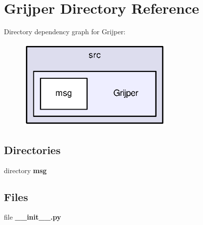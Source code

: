 \section{Grijper Directory Reference}
\label{dir_6ece005d40bc20ec437195d9bab1d725}
Directory dependency graph for Grijper\-:\nopagebreak
\begin{figure}[H]
\begin{center}
\leavevmode
\includegraphics[width=218pt]{dir_6ece005d40bc20ec437195d9bab1d725_dep}
\end{center}
\end{figure}
\subsection*{Directories}
\begin{DoxyCompactItemize}
\item 
directory {\bf msg}
\end{DoxyCompactItemize}
\subsection*{Files}
\begin{DoxyCompactItemize}
\item 
file {\bf \-\_\-\-\_\-init\-\_\-\-\_\-.\-py}
\end{DoxyCompactItemize}
